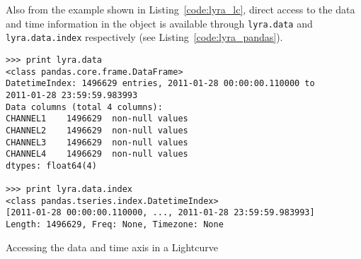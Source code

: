 Also from the example shown in Listing~\ref{code:lyra_lc}, direct access to 
the data and time information in the object is available through 
\texttt{lyra.data} and \texttt{lyra.data.index} respectively 
(see Listing~\ref{code:lyra_pandas}).

\begin{listing}[H]
\begin{verbatim}
>>> print lyra.data
<class pandas.core.frame.DataFrame>
DatetimeIndex: 1496629 entries, 2011-01-28 00:00:00.110000 to 
2011-01-28 23:59:59.983993
Data columns (total 4 columns):
CHANNEL1    1496629  non-null values
CHANNEL2    1496629  non-null values
CHANNEL3    1496629  non-null values
CHANNEL4    1496629  non-null values
dtypes: float64(4)

>>> print lyra.data.index
<class pandas.tseries.index.DatetimeIndex>
[2011-01-28 00:00:00.110000, ..., 2011-01-28 23:59:59.983993]
Length: 1496629, Freq: None, Timezone: None
\end{verbatim}
\caption{Accessing the data and time axis in a Lightcurve}
\label{code:lyra_pandas}
\end{listing}
